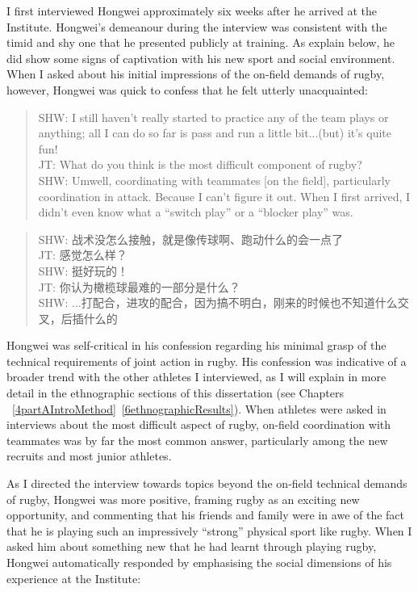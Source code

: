 \begin{CJK}{UTF8}{gbsn}
I first interviewed Hongwei approximately six weeks after he arrived at the Institute.   Hongwei's demeanour during the interview was consistent with the timid and shy one that he presented publicly at training.  As explain below, he did show some signs of captivation with his new sport and social environment.  When I asked about his initial impressions of the on-field demands of rugby, however, Hongwei was quick to confess that he felt utterly unacquainted:

\begin{quotation}
  SHW: I still haven’t really started to practice any of the team plays or anything; all I can do so far is pass and run a little bit...(but) it's quite fun! \\
  JT: What do you think is the most difficult component of rugby? \\
  SHW: Um\textellipsis well, coordinating with teammates [on the field], particularly coordination in attack.  Because I can't figure it out.  When I first arrived, I didn’t even know what a ``switch play'' or a ``blocker play'' was.
\end{quotation}

  \begin{quotation}
    SHW: 战术没怎么接触，就是像传球啊、跑动什么的会一点了 \\
    JT: 感觉怎么样？\\
    SHW: 挺好玩的！\\
    JT: 你认为橄榄球最难的一部分是什么？ \\
    SHW: ...打配合，进攻的配合，因为搞不明白，刚来的时候也不知道什么交叉，后插什么的 \\
  \end{quotation}

Hongwei was self-critical in his confession regarding his minimal grasp of the technical requirements of joint action in rugby. His confession was indicative of a broader trend with the other athletes I interviewed, as I will explain in more detail in the ethnographic sections of this dissertation (see Chapters ~\ref{4partAIntroMethod}\nobreakdash~\ref{6ethnographicResults}). When athletes were asked in interviews about the most difficult aspect of rugby, on-field coordination with teammates was by far the most common answer, particularly among the new recruits and most junior athletes.

As I directed the interview towards topics beyond the on-field technical demands of rugby, Hongwei was more positive, framing rugby as an exciting new opportunity, and commenting that his friends and family were in awe of the fact that he is playing such an impressively ``strong'' physical sport like rugby.  When I asked him about something new that he had learnt through playing rugby, Hongwei automatically responded by emphasising the social dimensions of his experience at the Institute:


\end{CJK}
